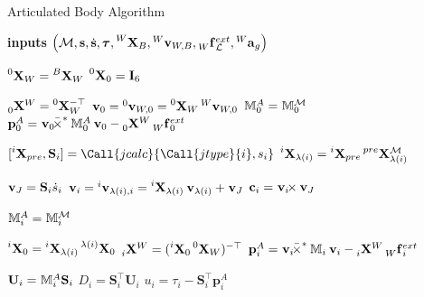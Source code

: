 \begin{algorithm}
\caption{Articulated Body Algorithm}

\label{algo:aba}

\begin{algorithmic}[1]

\small

\State \textbf{inputs} $\left(\mathcal{M}, \Shape, \Shaped, \Torques, \transvel[W]_B, \velsix[W]_{W,B}, \forcesix[W]^{ext}_\mathcal{L}, \accsix[W]_g \right)$

\State $\transvel[0]_{W} = \transvel[B]_W$
\State $\transvel[0]_{0} = \eye_6$

    \State $\transfor[0]^W = \transvel[0]_W^{-\top}$
    \State $\velsix_0 = \velsix[0]_{W,0} = \transvel[0]_{W} \velsix[W]_{W,0}$
    \State $\masssix^A_0 = \masssix_0^{\mathcal{M}}$
    \State $\mathbf{p}^A_0 = \crossforsix[\velsix_0] \masssix_0^A \velsix_0 - \transfor[0]^W \forcesix[W]_0^{ext}$
\EndIf

    
    \State $[\transvel[i]_{pre}, \mathbf{S}_i] = \Call{jcalc}{\Call{jtype}{i}, s_i}$
    \State $\transvel[i]_{\lambda(i)} = \transvel[i]_{pre} \transvel[pre]_{\lambda(i)}^{\mathcal{M}}$
    
    \State $\velsix_J = \mathbf{S}_i \dot{s}_i$
    \State $\velsix_i = \velsix[i]_{\lambda(i),i} = \transvel[i]_{\lambda(i)} \velsix_{\lambda(i)} + \velsix_J$
    \State $\mathbf{c}_i = \crossvelsix[\velsix_i] \velsix_J$
    
    \State $\masssix^A_i = \masssix_i^{\mathcal{M}}$
    
    \State $\transvel[i]_0 = \transvel[i]_{\lambda(i)} \transvel[\lambda(i)]_0$
    \State $\transfor[i]^W = (\transvel[i]_0 \transvel[0]_W)^{-\top}$
    \State $\mathbf{p}^A_i = \crossforsix[\velsix_i] \masssix_i \velsix_i - \transfor[i]^W \forcesix[W]_i^{ext}$

\EndFor

    
    \State $\mathbf{U}_i = \masssix_i^A \mathbf{S}_i$
    \State $D_i = \mathbf{S}_i^\top \mathbf{U}_i$
    \State $u_i = \tau_i - \mathbf{S}_i^\top \mathbf{p}_i^A$
    

\end{algorithmic}
\end{algorithm}
